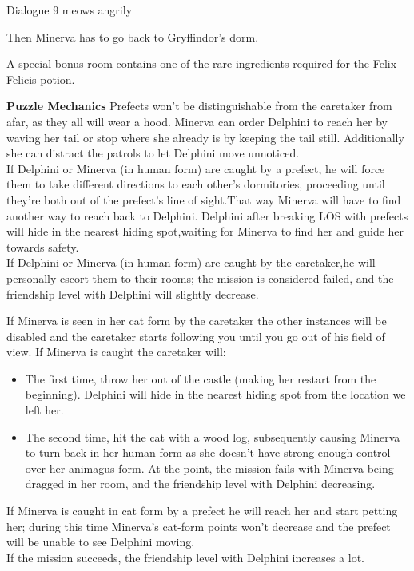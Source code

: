 \begin{dialogue}{Dialogue 9} 
	\*meows angrily\*
\end{dialogue} 


Then Minerva has to go back to Gryffindor's dorm.

A special bonus room contains one of the rare ingredients required for the Felix Felicis potion.
\pagebreak 

\textbf{Puzzle Mechanics} 
Prefects won't be distinguishable from the caretaker from afar, as they all will wear a hood. Minerva can order Delphini to reach her by waving her tail or stop where she already is by keeping the tail still. Additionally she can distract the patrols to let Delphini move unnoticed. \\

If Delphini or Minerva (in human form) are caught by a prefect, he will force them to take different directions to each other's dormitories, proceeding until they're both out of the prefect's line of sight.That way Minerva will have to find another way to reach back to Delphini. Delphini after breaking LOS with prefects will hide in the nearest hiding spot,waiting for Minerva to find her and guide her towards safety.\\

If Delphini or Minerva (in human form) are caught by the caretaker,he will personally escort them to their rooms; the mission is considered failed, and the friendship level with Delphini will slightly decrease.\\


If Minerva is seen in her cat form by the caretaker the other instances will be disabled and the caretaker starts following you until you go out of his field of view.
If Minerva is caught the caretaker will: \\

\begin{itemize}
    \item The first time, throw her out of the castle (making her restart from the beginning). Delphini will hide in the nearest hiding spot from the location we left her.
    \item The second time, hit the cat with a wood log, subsequently causing Minerva to turn back in her human form as she doesn't have strong enough control over her animagus form. At the point, the mission fails with Minerva being dragged in her room, and the friendship level with Delphini decreasing.
\end{itemize}
If Minerva is caught in cat form by a prefect he will reach her and start petting her; during this time Minerva's cat-form points won't decrease and the prefect will be unable to see Delphini moving.\\

If the mission succeeds, the friendship level with Delphini increases a lot.
\pagebreak


